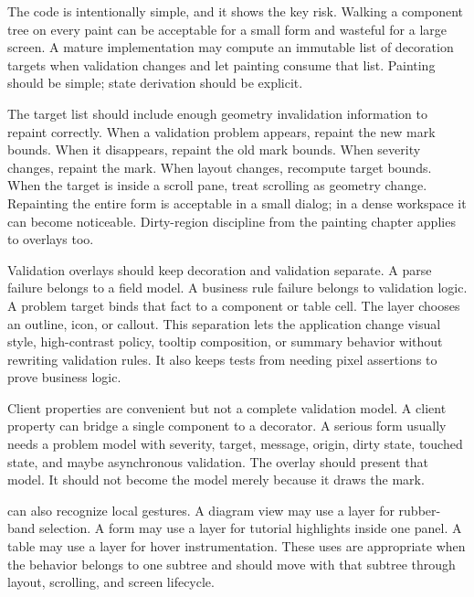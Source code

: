 The code is intentionally simple, and it shows the key risk. Walking a component tree on every paint can be acceptable for a small form and wasteful for a large screen. A mature implementation may compute an immutable list of decoration targets when validation changes and let painting consume that list. Painting should be simple; state derivation should be explicit.

The target list should include enough geometry invalidation information to
repaint correctly. When a validation problem appears, repaint the new mark
bounds. When it disappears, repaint the old mark bounds. When severity changes,
repaint the mark. When layout changes, recompute target bounds. When the target
is inside a scroll pane, treat scrolling as geometry change. Repainting the
entire form is acceptable in a small dialog; in a dense workspace it can become
noticeable. Dirty-region discipline from the painting chapter applies to
overlays too.

Validation overlays should keep decoration and validation separate. A parse
failure belongs to a field model. A business rule failure belongs to validation
logic. A problem target binds that fact to a component or table cell. The layer
chooses an outline, icon, or callout. This separation lets the application
change visual style, high-contrast policy, tooltip composition, or summary
behavior without rewriting validation rules. It also keeps tests from needing
pixel assertions to prove business logic.

Client properties are convenient but not a complete validation model. A client property can bridge a single component to a decorator. A serious form usually needs a problem model with severity, target, message, origin, dirty state, touched state, and maybe asynchronous validation. The overlay should present that model. It should not become the model merely because it draws the mark.

 can also recognize local gestures. A diagram view may use a layer for rubber-band selection. A form may use a layer for tutorial highlights inside one panel. A table may use a layer for hover instrumentation. These uses are appropriate when the behavior belongs to one subtree and should move with that subtree through layout, scrolling, and screen lifecycle.

